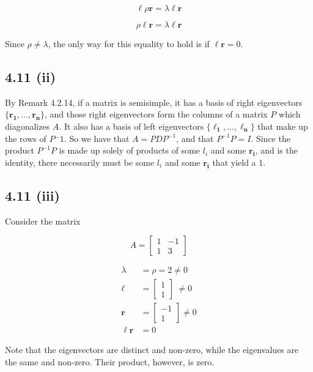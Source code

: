 \documentclass[letterpaper,12pt]{article}
\theoremstyle{definition}
\begin{document}
\[ \mathbf{\ell}\rho \mathbf{r} = \lambda \mathbf{\ell}\mathbf{r} \]

\[ \rho \mathbf{\ell}\mathbf{r} = \lambda \mathbf{\ell} \mathbf{r}\]
 
Since $\rho \neq \lambda$, the only way for this equality to hold is if $ \mathbf{\ell}\mathbf{r}= 0$.

\subsection*{4.11 (ii)}
By Remark 4.2.14, if a matrix is semisimple, it has a basis of right eigenvectors $\{\mathbf{r_1,...,r_n}\}$, and those right eigenvectors form the columns of a matrix $P$ which diagonalizes $A$. It also has a basis of left eigenvectors $\{\mathbf{\ell_1,...,\ell_n}\}$ that make up the rows of $P{^-1}$. So we have that $A = PDP^{-1}$, and that $P^{-1}P = I$. Since the product $P^{-1}P$ is made up solely of products of some $l_i$ and some $\mathbf{r_i}$, and is the identity, there necessarily must be some $l_i$ and some $\mathbf{r_i}$ that yield a 1.

\subsection*{4.11 (iii)}

Consider the matrix 

\[A = \begin{bmatrix}
1 & -1\\
1 & 3
\end{bmatrix}\]

\begin{align*}
\lambda &= \rho = 2 \neq 0\\
\mathbf{\ell} &= \begin{bmatrix}
1\\
1
\end{bmatrix} \ \neq 0\\
\mathbf{r} &= \begin{bmatrix}
-1\\
1
\end{bmatrix} \neq 0 \\
\mathbf{\ell r} &= 0
\end{align*}

Note that the eigenvectors are distinct and non-zero, while the eigenvalues are the same and non-zero. Their product, however, is zero.
\end{document}
